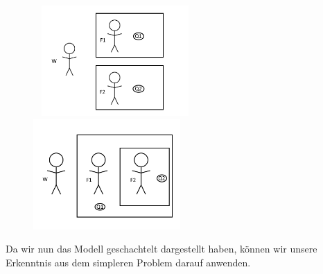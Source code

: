 \documentclass[a4paper]{article}
\begin{document}
\begin{figure}[!htb]
\begin{floatrow}[2]\
%
{\includegraphics[width=0.5\textwidth]{c.png}}
%
%
{\includegraphics[width=0.5\textwidth]{d.png}}
\end{floatrow}
\end{figure}
Da wir nun das Modell geschachtelt dargestellt haben, können wir unsere Erkenntnis aus dem simpleren Problem darauf anwenden.
\end{document}
